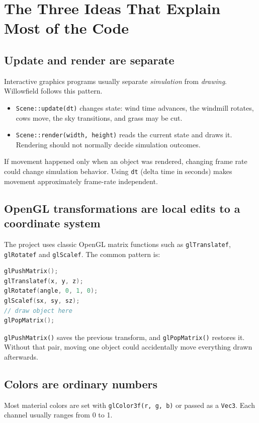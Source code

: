 \documentclass[11pt,a4paper,openany]{book}
\newcommand{\code}[1]{\texttt{#1}}
\begin{document}
\chapter{The Three Ideas That Explain Most of the Code}
\section{Update and render are separate}
Interactive graphics programs usually separate \emph{simulation} from \emph{drawing}. Willowfield follows this pattern.

\begin{itemize}
	\item \code{Scene::update(dt)} changes state: wind time advances, the windmill rotates, cows move, the sky transitions, and grass may be cut.
	\item \code{Scene::render(width, height)} reads the current state and draws it. Rendering should not normally decide simulation outcomes.
\end{itemize}

\begin{whybox}
	If movement happened only when an object was rendered, changing frame rate could change simulation behavior. Using \code{dt} (delta time in seconds) makes movement approximately frame-rate independent.
\end{whybox}

\section{OpenGL transformations are local edits to a coordinate system}
The project uses classic OpenGL matrix functions such as \code{glTranslatef}, \code{glRotatef} and \code{glScalef}. The common pattern is:
\begin{lstlisting}[language=C++]
glPushMatrix();
glTranslatef(x, y, z);
glRotatef(angle, 0, 1, 0);
glScalef(sx, sy, sz);
// draw object here
glPopMatrix();
\end{lstlisting}
\code{glPushMatrix()} saves the previous transform, and \code{glPopMatrix()} restores it. Without that pair, moving one object could accidentally move everything drawn afterwards.

\section{Colors are ordinary numbers}
Most material colors are set with \code{glColor3f(r, g, b)} or passed as a \code{Vec3}. Each channel usually ranges from 0 to 1.
\end{document}
